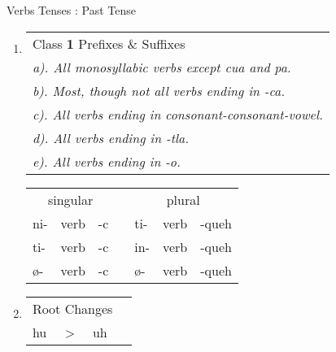 \documentclass[12pt]{beamer}
\newcommand{\nah}[1]{\textcolor{nahgrn}{#1}}
\newcommand{\trs}[1]{\textcolor{nahblu}{#1}}
\begin{document}
\begin{frame}
\begin{columns}[t]
\begin{column}{.23\linewidth}
    \end{column}
    \begin{column}{.26\linewidth}
      \begin{block}{Verbs Tenses : Past Tense}
      	\begin{enumerate}
      		\item \begin{tabular}[t]{l} %
      			Class \textbf{1} \nah{Prefixes} \& \trs{Suffixes}			\\
      			\textit{a). All monosyllabic verbs except cua and pa.} 		\\
      			\textit{b). Most, though not all verbs ending in -ca.} 		\\
      			\textit{c). All verbs ending in consonant-consonant-vowel.} \\
      			\textit{d). All verbs ending in -tla.} 						\\
      			\textit{e). All verbs ending in -o.}						\\
      		\end{tabular}
      		\begin{tabular}[t]{lllllll}
      			\multicolumn{3}{c}{singular}    & \vline & \multicolumn{3}{c}{plural}        \\
      			\cline{1-7}
      			\nah{ni-}   & verb & \trs{-c}   & \vline & \nah{ti-}   & verb & \trs{-queh}  \\
      			\nah{ti-}   & verb & \trs{-c}   & \vline & \nah{in-}   & verb & \trs{-queh}  \\
      			\nah{ø-}    & verb & \trs{-c}   & \vline & \nah{ø-}    & verb & \trs{-queh}  \\
      		\end{tabular}
      		\item \text{Class \textbf{2} \nah{Prefixes} \& \trs{Suffixes}} \newline
      		\newline
      		\begin{tabular}[t]{llll}
      			\multicolumn{3}{c}{Root Changes} & \vline \\
      			\cline{1-3}
      			hu	& > & uh & \vline	\\

\end{tabular}
\end{enumerate}
\end{block}
\end{column}
\end{columns}
\end{frame}
\end{document}
